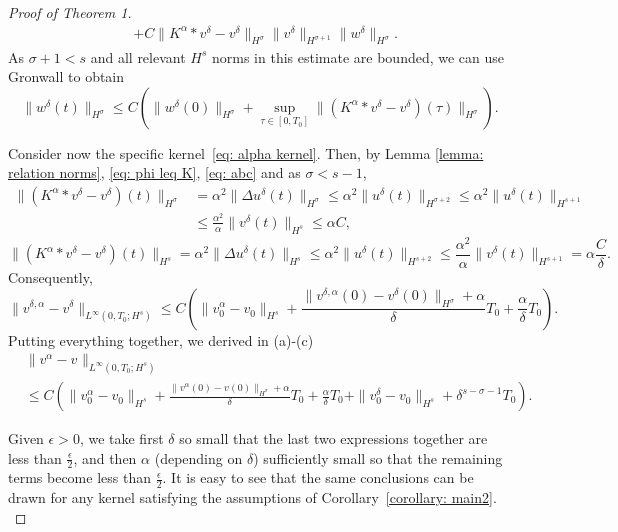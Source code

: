 \documentclass{amsart}
\begin{document}
\begin{proof}[Proof of Theorem 1]
\begin{equation*}
\begin{aligned}
&+C\|K^{\alpha}*v^{\delta}-v^{\delta}\|_{H^\sigma} \|v^{\delta}\|_{H^{\sigma+1}}\|w^{\delta}\|_{H^\sigma}. 
\end{aligned}
\end{equation*}
As $\sigma+1<s$ and all relevant $H^s$ norms in this estimate are bounded, we can use Gronwall to obtain  
\begin{equation}
\label{eq: Besov l}
     \|w^{\delta}(t) \|_{H^{\sigma}} \leq C(  \|w^{\delta}(0) \|_{H^{\sigma}} + \sup_{\tau\in[0,T_0]}\|(K^{\alpha}*v^{\delta}-v^{\delta})(\tau)\|_{H^{\sigma}}).
\end{equation}

Consider now the specific kernel~\eqref{eq: alpha kernel}. Then, by Lemma \ref{lemma: relation norms}, \eqref{eq: phi leq K}, \eqref{eq: abc} and as $\sigma < s-1$,
\begin{equation*}
\begin{aligned}
 \|(K^{\alpha}*v^{\delta}-v^{\delta})(t)\|_{H^{\sigma}} &= 
\alpha^2 \|\Delta u^{\delta} (t)\|_{H^{\sigma}} \leq  \alpha^2 \|u^{\delta}(t) \|_{H^{\sigma+2}} \leq \alpha^2 \|u^{\delta} (t)\|_{H^{s+1}} \\
&\leq  \frac{\alpha^2}{\alpha} \|v^{\delta} (t)\|_{H^s} \leq  \alpha C,
\end{aligned}
\end{equation*}
$$ \|(K^{\alpha}*v^{\delta}-v^{\delta})(t)\|_{H^s}   = 
\alpha^2 \|\Delta u^{\delta} (t) \|_{H^s} \leq  \alpha^2 \|u^{\delta} (t) \|_{H^{s+2}} \leq  \frac{\alpha^2}{\alpha} \|v^{\delta}(t)\|_{H^{s+1}} = \alpha \frac{C}{\delta}.$$
Consequently,
$$ \|v^{\delta, \alpha}-v^{\delta}\|_{L^{\infty}(0,T_0;H^s)} \leq C \left(\|v^{\alpha}_0-v^{}_0\|_{H^s} + \frac{\|v^{\delta, \alpha}(0)-v^{\delta}(0) \|_{H^{\sigma}} +\alpha}{\delta} T_0 +\frac{\alpha}{\delta} T_0\right).$$
Putting everything together, we derived in (a)-(c)
\begin{equation*}
\begin{aligned} 
&\|v^{\alpha}-v^{}\|_{L^{\infty}(0,T_0;H^s)}\\ 
&\leq  C \left(\|v^{\alpha}_0-v^{}_0\|_{H^s} + \frac{\|v^{\alpha}(0)-v^{}(0) \|_{H^{\sigma}} +\alpha}{\delta} T_0 +\frac{\alpha}{\delta} T_0 + \|v^{\delta}_0-v^{}_0\|_{H^s} + \delta^{s-\sigma-1} T_0\right).
\end{aligned}
\end{equation*}

Given $\epsilon>0$, we take first $\delta$ so small that the last two expressions together are less than $\frac\epsilon2$, and then $\alpha$ (depending on $\delta$) sufficiently small so that the remaining terms become less than $\frac\epsilon2$. It is easy to see that the same conclusions can be drawn for any kernel satisfying the assumptions of Corollary~\ref{corollary: main2}.\\


\end{proof}
\end{document}
